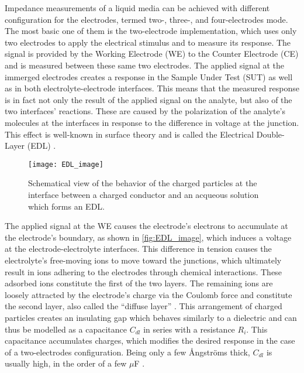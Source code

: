 Impedance measurements of a liquid media can be achieved with different configuration for the electrodes, termed two-, three-, and four-electrodes mode. The most basic one of them is the two-electrode implementation, which uses only two electrodes to apply the electrical stimulus and to measure its response. The signal is provided by the Working Electrode (WE) to the Counter Electrode (CE) \cite{Grossi2017} and is measured between these same two electrodes. The applied signal at the immerged electrodes creates a response in the Sample Under Test (SUT) as well as in both electrolyte-electrode interfaces. This means that the measured response is in fact not only the result of the applied signal on the analyte, but also of the two interfaces’ reactions. These are caused by the polarization of the analyte’s molecules at the interfaces in response to the difference in voltage at the junction. This effect is well-known in surface theory and is called the Electrical Double-Layer (EDL) \cite{grahame1947electrical}. \par
\begin{figure}[h]
    \centering
    \texttt{[image: EDL\_image]}
    \caption{Schematical view of the behavior of the charged particles at the interface between a charged conductor and an acqueous solution which forms an EDL. \citep{EDL_image}}
    \label{fig:EDL_image}
\end{figure}
The applied signal at the WE causes the electrode’s electrons to accumulate at the electrode’s boundary, as shown in \autoref{fig:EDL_image}, which induces a voltage at the electrode-electrolyte interfaces. This difference in tension causes the electrolyte’s free-moving ions to move toward the junctions, which ultimately result in ions adhering to the electrodes through chemical interactions. These adsorbed ions constitute the first of the two layers. The remaining ions are loosely attracted by the electrode’s charge via the Coulomb force and constitute the second layer, also called the “diffuse layer” \cite{grahame1947electrical}. This arrangement of charged particles creates an insulating gap which behaves similarly to a dielectric and can thus be modelled as a capacitance $C_{dl}$ in series with a resistance $R_i$.  This capacitance accumulates charges, which modifies the desired response in the case of a two-electrodes configuration. Being only a few Ångströms thick, $C_{dl}$ is usually high, in the order of a few $\mu$F \cite{grahame1947electrical}.

